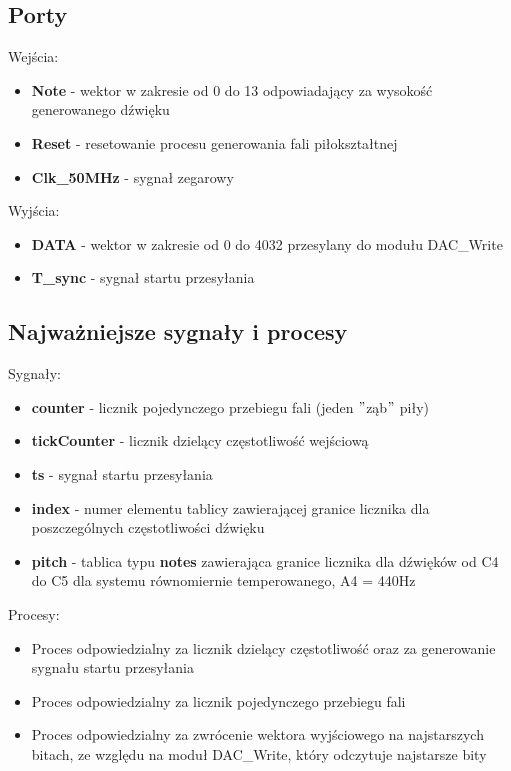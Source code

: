 \documentclass[a4paper]{report}
\begin{document}
		\subsection{Porty}
		{\Large Wejścia:}
			\begin{itemize}	 
				\item \textbf{Note} - wektor w zakresie od 0 do 13 odpowiadający za wysokość generowanego dźwięku
				\item \textbf{Reset} - resetowanie procesu generowania fali piłokształtnej
				\item \textbf{Clk\_50MHz} - sygnał zegarowy
			\end{itemize}
		{\Large Wyjścia:}
			\begin{itemize} 
				\item \textbf{DATA} - wektor w zakresie od 0 do 4032 przesylany do modułu DAC\_Write
				\item \textbf{T\_sync} - sygnał startu przesyłania
			\end{itemize}
			\newpage
		\subsection{Najważniejsze sygnały i procesy}
		{\Large Sygnały:}
			\begin{itemize}
				\item \textbf{counter} - licznik pojedynczego przebiegu fali (jeden $"$ząb$"$ piły)
				\item \textbf{tickCounter} - licznik dzielący częstotliwość wejściową
				\item \textbf{ts} - sygnał startu przesyłania
				\item \textbf{index} - numer elementu tablicy zawierającej granice licznika dla poszczególnych częstotliwości dźwięku
				\item \textbf{pitch} - tablica typu \textbf{notes} zawierająca granice licznika dla dźwięków od C4 do C5 dla systemu równomiernie temperowanego, A4 = 440Hz
			\end{itemize}
		{\Large Procesy:}
			\begin{itemize}
			\item Proces odpowiedzialny za licznik dzielący częstotliwość oraz za generowanie sygnału startu przesyłania\\
				
			\item Proces odpowiedzialny za licznik pojedynczego przebiegu fali\\
				
			\item Proces odpowiedzialny za zwrócenie wektora wyjściowego na najstarszych bitach, ze względu na moduł DAC\_Write, który odczytuje najstarsze bity\\
				
			\end{itemize}
		
\end{document}
